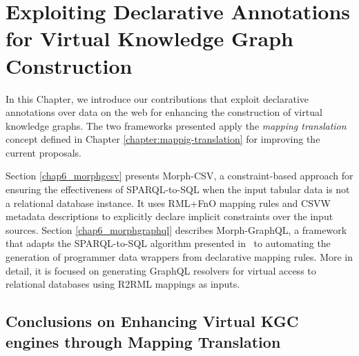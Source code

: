 
\chapter{Exploiting Declarative Annotations for Virtual Knowledge Graph Construction}
\label{chapter:virtual}

In this Chapter, we introduce our contributions that exploit declarative annotations over data on the web for enhancing the construction of virtual knowledge graphs. The two frameworks presented apply the \textit{mapping translation} concept defined in Chapter \ref{chapter:mappig-translation} for improving the current proposals. 

Section \ref{chap6_morphgcsv} presents Morph-CSV, a constraint-based approach for ensuring the effectiveness of SPARQL-to-SQL when the input tabular data is not a relational database instance. It uses RML+FnO mapping rules and CSVW metadata descriptions to explicitly declare implicit constraints over the input sources. Section \ref{chap6_morphgraphql} describes Morph-GraphQL, a framework that adapts the SPARQL-to-SQL algorithm presented in~\citep{chebotko2009semantics} to automating the generation of programmer data wrappers from declarative mapping rules. More in detail, it is focused on generating GraphQL resolvers for virtual access to relational databases using R2RML mappings as inputs.





\section{Conclusions on Enhancing Virtual KGC engines through Mapping Translation}